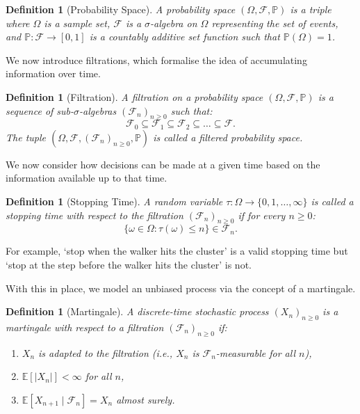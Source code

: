 \documentclass[12pt, a4paper, oneside]{report}
\newtheorem{definition}[theorem]{Definition}
\theoremstyle{remark}
\begin{document}
\begin{definition}[Probability Space]
A probability space $(\Omega, \mathcal{F}, \mathbb{P})$ is a triple where $\Omega$ is a sample set, $\mathcal{F}$ is a $\sigma$-algebra on $\Omega$ representing the set of events, and $\mathbb{P} \colon \mathcal{F}\to[0,1]$ is a countably additive set function such that $\mathbb{P}(\Omega)=1$.
\end{definition}

\noindent We now introduce filtrations, which formalise the idea of accumulating information over time. 
\begin{definition}[Filtration]
A filtration on a probability space $(\Omega, \mathcal{F}, \mathbb{P})$ is a sequence of sub-$\sigma$-algebras $(\mathcal{F}_n)_{n \geq 0}$ such that:
\begin{equation*}
    \mathcal{F}_0 \subseteq \mathcal{F}_1 \subseteq \mathcal{F}_2 \subseteq \dots \subseteq \mathcal{F}.
\end{equation*}
The tuple $(\Omega, \mathcal{F}, (\mathcal{F}_n)_{n \geq 0}, \mathbb{P})$ is called a filtered probability space.
\end{definition}

\noindent We now consider how decisions can be made at a given time based on the information available up to that time.
\begin{definition}[Stopping Time]
A random variable $\tau \colon \Omega \to \{0, 1, \dots, \infty\}$ is called a stopping time with respect to the filtration $(\mathcal{F}_n)_{n \geq 0}$ if for every $n \geq 0$:
\begin{equation*}
    \{ \omega \in \Omega : \tau(\omega) \leq n \} \in \mathcal{F}_n.
\end{equation*}
\end{definition}

\noindent For example, `stop when the walker hits the cluster' is a valid stopping time but `stop at the step before the walker hits the cluster' is not.

\noindent With this in place, we model an unbiased process via the concept of a martingale.
\begin{definition}[Martingale]
A discrete-time stochastic process $(X_n)_{n \geq 0}$ is a martingale with respect to a filtration $(\mathcal{F}_n)_{n \geq 0}$ if:
\begin{enumerate}
    \item $X_n$ is adapted to the filtration (i.e., $X_n$ is $\mathcal{F}_n$-measurable for all $n$),
    \item $\mathbb{E}[|X_n|] < \infty$ for all $n$,
    \item $\mathbb{E}[X_{n+1} \mid \mathcal{F}_n] = X_n$ almost surely.
\end{enumerate}
\end{definition}
\end{document}
